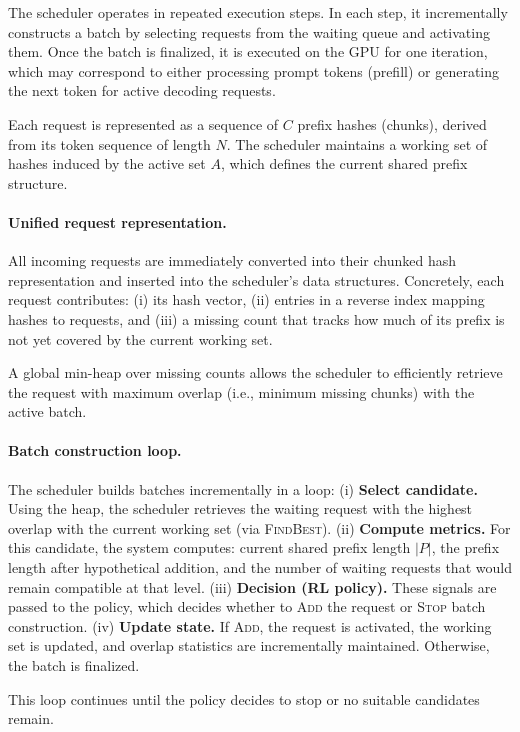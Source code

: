The scheduler operates in repeated execution steps. In each step, it incrementally constructs a batch by selecting requests from the waiting queue and activating them. Once the batch is finalized, it is executed on the GPU for one iteration, which may correspond to either processing prompt tokens (prefill) or generating the next token for active decoding requests.

Each request is represented as a sequence of $C$ prefix hashes (chunks), derived from its token sequence of length $N$. The scheduler maintains a working set of hashes induced by the active set $A$, which defines the current shared prefix structure.

\paragraph{Unified request representation.}
All incoming requests are immediately converted into their chunked hash representation and inserted into the scheduler's data structures. Concretely, each request contributes:
(i) its hash vector,
(ii) entries in a reverse index mapping hashes to requests, and 
(iii) a missing count that tracks how much of its prefix is not yet covered by the current working set.

A global min-heap over missing counts allows the scheduler to efficiently retrieve the request with maximum overlap (i.e., minimum missing chunks) with the active batch.

\paragraph{Batch construction loop.} 
The scheduler builds batches incrementally in a loop: (i) \textbf{Select candidate.} Using the heap, the scheduler retrieves the waiting request with the highest overlap with the current working set (via \textsc{FindBest}). (ii) \textbf{Compute metrics.} For this candidate, the system computes: current shared prefix length $|P|$, the prefix length after hypothetical addition, and the number of waiting requests that would remain compatible at that level. (iii) \textbf{Decision (RL policy).} These signals are passed to the policy, which decides whether to \textsc{Add} the request or \textsc{Stop} batch construction. (iv) \textbf{Update state.} If \textsc{Add}, the request is activated, the working set is updated, and overlap statistics are incrementally maintained. Otherwise, the batch is finalized.

This loop continues until the policy decides to stop or no suitable candidates remain.

